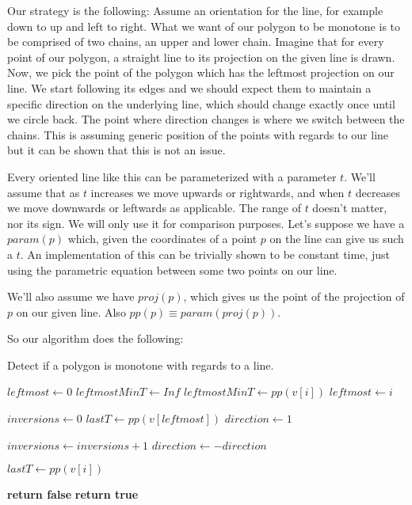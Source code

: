 \documentclass[11pt]{llncs}
\begin{document}
Our strategy is the following: Assume an orientation for the line, for example
down to up and left to right. What we want of our polygon to be monotone is to
be comprised of two chains, an upper and lower chain. Imagine that for every
point of our polygon, a straight line to its projection on the given line is
drawn. Now, we pick the point of the polygon which has the leftmost projection
on our line. We start following its edges and we should expect them to maintain
a specific direction on the underlying line, which should change exactly once
until we circle back. The point where direction changes is where we switch
between the chains. This is assuming generic position of the points with
regards to our line but it can be shown that this is not an issue.

Every oriented line like this can be parameterized with a parameter $t$. We'll
assume that as $t$ increases we move upwards or rightwards, and when $t$
decreases we move downwards or leftwards as applicable. The range of $t$
doesn't matter, nor its sign. We will only use it for comparison purposes.
Let's suppose we have a $param(p)$ which, given the coordinates of a point $p$
on the line can give us such a $t$. An implementation of this can be trivially
shown to be constant time, just using the parametric equation between some two
points on our line.

We'll also assume we have $proj(p)$, which gives us the point of the projection
of $p$ on our given line. Also $pp(p) \equiv param(proj(p))$.

So our algorithm does the following: 

\begin{algorithm}
	\caption{Detect if a polygon is monotone with regards to a line.}\label{alg.monotone}
	\begin{algorithmic}[1]
		\State $leftmost \gets 0$
		\State $leftmostMinT \gets Inf$
		 
				\State $leftmostMinT \gets pp(v[i])$
				\State $leftmost \gets i$
			\EndIf
		\EndFor

		\State $inversions \gets 0$
		\State $lastT \gets pp(v[leftmost])$
		\State $direction \gets 1$

		 
				\State $inversions \gets inversions + 1$
				\State $direction \gets -direction$
			\EndIf

			\State $lastT \gets pp(v[i])$

				\State \textbf{return false}
			\EndIf
		\EndFor
		\State \textbf{return true}
	\end{algorithmic}
\end{algorithm}
\end{document}
